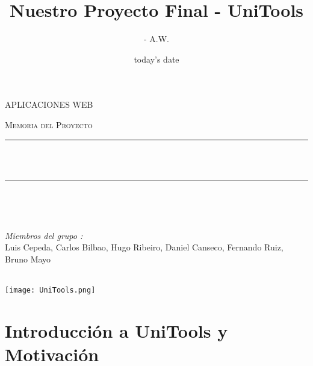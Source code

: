 \documentclass[12pt]{report}
\title{Nuestro Proyecto Final - UniTools}
\author{- A.W.}
\date{today's date}
\makeatletter
\let\thetitle\@title
\makeatother
\begin{document}

\begin{titlepage}
	\centering
    \vspace*{0.5 cm}
\begin{center}    \textsc{\Large  APLICACIONES WEB}\\[2.0 cm]	\end{center}%
	\textsc{\Large Memoria del Proyecto }\\[0.5 cm]				%
	\rule{\linewidth}{0.2 mm} \\[0.4 cm]
	{ \huge \bfseries \thetitle}\\
	\rule{\linewidth}{0.2 mm} \\[1.5 cm]
	
	\begin{minipage}{0.4\textwidth}
		\begin{flushleft} \large
			\end{flushleft}
			\end{minipage}~
			\begin{minipage}{0.4\textwidth}
            
			\begin{flushright} \large
			\emph{Miembros del grupo :} \\
			Luis Cepeda, Carlos Bilbao,
			Hugo Ribeiro, Daniel Canseco,
			Fernando Ruiz, Bruno Mayo
			
		\end{flushright}
           
	\end{minipage}\\[2 cm]
	
	\texttt{[image: UniTools.png]}

\end{titlepage}

\tableofcontents
\pagebreak

\renewcommand{\thesection}{\arabic{section}}
\section{Introducción a UniTools y Motivación}
\end{document}
